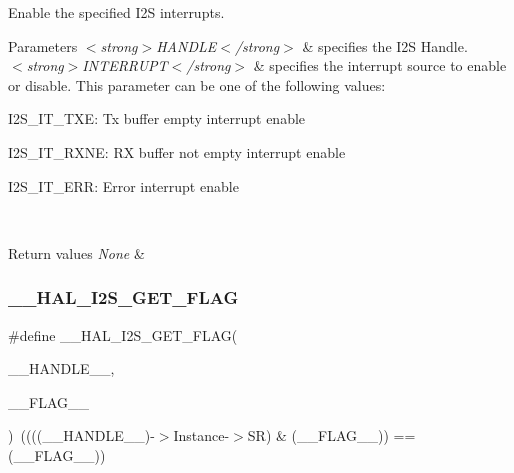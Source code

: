 Enable the specified I2S interrupts. 


\begin{DoxyParams}{Parameters}
{\em $<$strong$>$\+H\+A\+N\+D\+L\+E$<$/strong$>$} & specifies the I2S Handle. \\
\hline
{\em $<$strong$>$\+I\+N\+T\+E\+R\+R\+U\+P\+T$<$/strong$>$} & specifies the interrupt source to enable or disable. This parameter can be one of the following values\+: \begin{DoxyItemize}
\item I2\+S\+\_\+\+I\+T\+\_\+\+T\+XE\+: Tx buffer empty interrupt enable \item I2\+S\+\_\+\+I\+T\+\_\+\+R\+X\+NE\+: RX buffer not empty interrupt enable \item I2\+S\+\_\+\+I\+T\+\_\+\+E\+RR\+: Error interrupt enable \end{DoxyItemize}
\\
\hline
\end{DoxyParams}

\begin{DoxyRetVals}{Return values}
{\em None} & \\
\hline
\end{DoxyRetVals}
\mbox{\label{group___i2_s___exported__macros_gab4dcaccc00ab76a11c23a49e973df009}} 
\subsubsection{\texorpdfstring{\+\_\+\+\_\+\+H\+A\+L\+\_\+\+I2\+S\+\_\+\+G\+E\+T\+\_\+\+F\+L\+AG}{\_\_HAL\_I2S\_GET\_FLAG}}
{\footnotesize\ttfamily \#define \+\_\+\+\_\+\+H\+A\+L\+\_\+\+I2\+S\+\_\+\+G\+E\+T\+\_\+\+F\+L\+AG(\begin{DoxyParamCaption}\item[{}]{\+\_\+\+\_\+\+H\+A\+N\+D\+L\+E\+\_\+\+\_\+,  }\item[{}]{\+\_\+\+\_\+\+F\+L\+A\+G\+\_\+\+\_\+ }\end{DoxyParamCaption})~((((\+\_\+\+\_\+\+H\+A\+N\+D\+L\+E\+\_\+\+\_\+)-\/$>$Instance-\/$>$SR) \& (\+\_\+\+\_\+\+F\+L\+A\+G\+\_\+\+\_\+)) == (\+\_\+\+\_\+\+F\+L\+A\+G\+\_\+\+\_\+))}



